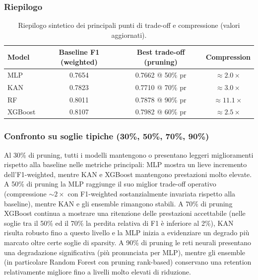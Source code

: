 \documentclass[a4paper,12pt]{report}
\begin{document}
	\subsubsection{Riepilogo}
	\begin{table}[H]
		\centering
		\begin{tabular}{lccc}
			\toprule
			\textbf{Model} & \textbf{Baseline F1 (weighted)} & \textbf{Best trade-off (pruning)} & \textbf{Compression} \\
			\midrule
			MLP      & 0.7654 & 0.7662 @ 50\% pr & $\approx 2.0\times$ \\
			KAN      & 0.7823 & 0.7710 @ 70\% pr & $\approx 3.0\times$ \\
			RF       & 0.8011 & 0.7878 @ 90\% pr & $\approx 11.1\times$ \\
			XGBoost  & 0.8107 & 0.7982 @ 60\% pr & $\approx 2.5\times$ \\
			\bottomrule
		\end{tabular}
		\caption{Riepilogo sintetico dei principali punti di trade-off e compressione (valori aggiornati).}
	\end{table}
	
	\subsubsection{Confronto su soglie tipiche (30\%, 50\%, 70\%, 90\%)}
	Al 30\% di pruning, tutti i modelli mantengono o presentano leggeri miglioramenti rispetto alla baseline nelle metriche principali: MLP mostra un lieve incremento dell'F1-weighted, mentre KAN e XGBoost mantengono prestazioni molto elevate. A 50\% di pruning la MLP raggiunge il suo miglior trade-off operativo (compressione $\sim 2\times$ con F1-weighted sostanzialmente invariata rispetto alla baseline), mentre KAN e gli ensemble rimangono stabili. A 70\% di pruning XGBoost continua a mostrare una ritenzione delle prestazioni accettabile (nelle soglie tra il 50\% ed il 70\% la perdita relativa di F1 è inferiore al 2\%), KAN risulta robusto fino a questo livello e la MLP inizia a evidenziare un degrado più marcato oltre certe soglie di sparsity. A 90\% di pruning le reti neurali presentano una degradazione significativa (più pronunciata per MLP), mentre gli ensemble (in particolare Random Forest con pruning rank-based) conservano una retention relativamente migliore fino a livelli molto elevati di riduzione.
	
\end{document}
